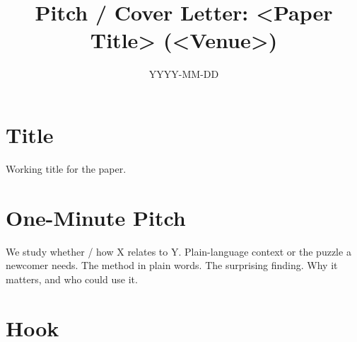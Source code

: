 \documentclass[11pt]{article}
\title{Pitch / Cover Letter: <Paper Title> (<Venue>)}
\date{YYYY-MM-DD}
\begin{document}
\maketitle

\section*{Title}
Working title for the paper.

\section*{One-Minute Pitch}
We study whether / how X relates to Y.
%
Plain-language context or the puzzle a newcomer needs.
%
The method in plain words.
%
The surprising finding.
%
Why it matters, and who could use it.

\section*{Hook}
\end{document}

